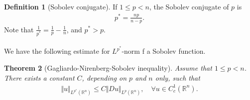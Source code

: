 \documentclass{article}
\numberwithin{equation}{section}
\newcommand{\bbR}{\mathbb{R}}
\theoremstyle{plain}
\newtheorem{theorem}{Theorem}[section]
\theoremstyle{definition}
\newtheorem{definition}[theorem]{Definition}
\begin{document}
\begin{definition}[Sobolev conjugate]
If $1\leq p<n$, the Sobolev conjugate of $p$ is
\begin{align*}
	p^*=\frac{np}{n-p}.
\end{align*}
Note that $\frac{1}{p^*}=\frac{1}{p}-\frac{1}{n}$, and $p^*>p$.
\end{definition}
\paragraph{} We have the following estimate for $L^{p^*}$-norm f a Sobolev function.
\begin{theorem}[Gagliardo-Nirenberg-Sobolev inequality]
Assume that $1\leq p<n$. There exists a constant $C$, depending on $p$ and $n$ only, such that
\begin{align}
	\Vert u\Vert_{L^{p^*}(\bbR^n)}\leq C\Vert Du\Vert_{L^p(\bbR^n)},\quad\forall u\in C^1_c(\bbR^n).\label{gnsinequality}
\end{align}
\end{theorem}
\end{document}
